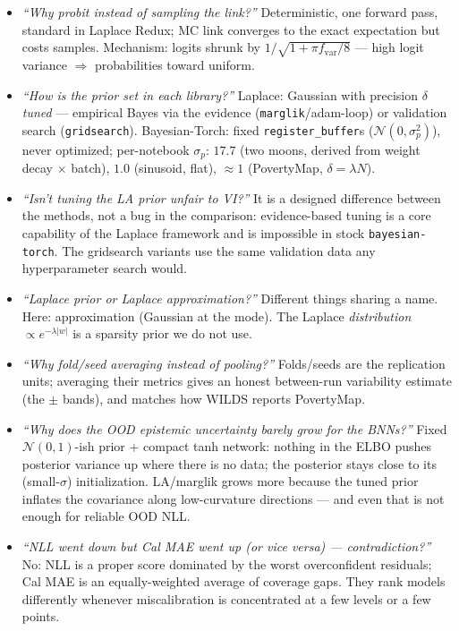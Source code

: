 \documentclass[10pt,a4paper]{article}
\newcommand{\code}[1]{\texttt{#1}}
\begin{document}
\begin{itemize}
\item \emph{``Why probit instead of sampling the link?''} Deterministic, one forward pass,
  standard in Laplace Redux; MC link converges to the exact expectation but costs samples.
  Mechanism: logits shrunk by $1/\sqrt{1+\pi f_{\mathrm{var}}/8}$ --- high logit variance
  $\Rightarrow$ probabilities toward uniform.
\item \emph{``How is the prior set in each library?''} Laplace: Gaussian with precision $\delta$
  \emph{tuned} --- empirical Bayes via the evidence (\code{marglik}/adam-loop) or validation
  search (\code{gridsearch}). Bayesian-Torch: fixed \code{register\_buffer}s
  ($\mathcal{N}(0,\sigma_p^2)$), never optimized; per-notebook $\sigma_p$: $17.7$ (two moons,
  derived from weight decay $\times$ batch), $1.0$ (sinusoid, flat), $\approx1$ (PovertyMap,
  $\delta=\lambda N$).
\item \emph{``Isn't tuning the LA prior unfair to VI?''} It is a designed difference between the
  methods, not a bug in the comparison: evidence-based tuning is a core capability of the Laplace
  framework and is impossible in stock \code{bayesian-torch}. The gridsearch variants use the same
  validation data any hyperparameter search would.
\item \emph{``Laplace prior or Laplace approximation?''} Different things sharing a name. Here:
  approximation (Gaussian at the mode). The Laplace \emph{distribution}
  $\propto e^{-\lambda|w|}$ is a sparsity prior we do not use.
\item \emph{``Why fold/seed averaging instead of pooling?''} Folds/seeds are the replication
  units; averaging their metrics gives an honest between-run variability estimate (the $\pm$
  bands), and matches how WILDS reports PovertyMap.
\item \emph{``Why does the OOD epistemic uncertainty barely grow for the BNNs?''} Fixed
  $\mathcal{N}(0,1)$-ish prior $+$ compact tanh network: nothing in the ELBO pushes posterior
  variance up where there is no data; the posterior stays close to its (small-$\sigma$)
  initialization. LA/marglik grows more because the tuned prior inflates the covariance along
  low-curvature directions --- and even that is not enough for reliable OOD NLL.
\item \emph{``NLL went down but Cal MAE went up (or vice versa) --- contradiction?''} No: NLL is a
  proper score dominated by the worst overconfident residuals; Cal MAE is an equally-weighted
  average of coverage gaps. They rank models differently whenever miscalibration is concentrated
  at a few levels or a few points.
\end{itemize}
\end{document}

